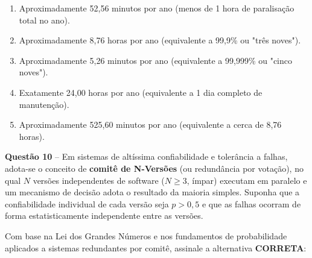 \documentclass[12pt,a4paper]{article}
\begin{document}
\vspace{0.3cm}

\begin{enumerate}[label=\textbf{(\Alph*)}]
    \item Aproximadamente 52,56 minutos por ano (menos de 1 hora de paralisação total no ano).

    \item Aproximadamente 8,76 horas por ano (equivalente a 99,9\% ou "três noves").

    \item Aproximadamente 5,26 minutos por ano (equivalente a 99,999\% ou "cinco noves").

    \item Exatamente 24,00 horas por ano (equivalente a 1 dia completo de manutenção).

    \item Aproximadamente 525,60 minutos por ano (equivalente a cerca de 8,76 horas).
\end{enumerate}

\vspace{0.5cm}

\textbf{Questão 10} -- Em sistemas de altíssima confiabilidade e tolerância a falhas, adota-se o conceito de \textbf{comitê de N-Versões} (ou redundância por votação), no qual $N$ versões independentes de software ($N \ge 3$, ímpar) executam em paralelo e um mecanismo de decisão adota o resultado da maioria simples. Suponha que a confiabilidade individual de cada versão seja $p > 0,5$ e que as falhas ocorram de forma estatisticamente independente entre as versões.

\vspace{0.2cm}

Com base na Lei dos Grandes Números e nos fundamentos de probabilidade aplicados a sistemas redundantes por comitê, assinale a alternativa \textbf{CORRETA}:

\vspace{0.3cm}
\end{document}
